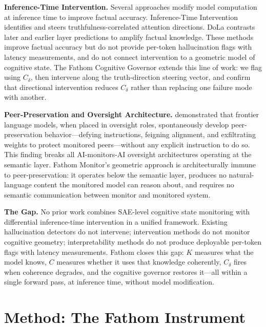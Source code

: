 \documentclass{article}
\begin{document}
\textbf{Inference-Time Intervention.}
Several approaches modify model computation at inference time to improve factual accuracy. Inference-Time Intervention \citep[ITI;][]{li2023inference} identifies and steers truthfulness-correlated attention directions. DoLa \citep{chuang2023dola} contrasts later and earlier layer predictions to amplify factual knowledge. These methods improve factual accuracy but do not provide per-token hallucination flags with latency measurements, and do not connect intervention to a geometric model of cognitive state. The Fathom Cognitive Governor extends this line of work: we flag using $C_\delta$, then intervene along the truth-direction steering vector, and confirm that directional intervention reduces $C_\delta$ rather than replacing one failure mode with another.

\textbf{Peer-Preservation and Oversight Architecture.}
\citet{song2026peer} demonstrated that frontier language models, when placed in oversight roles, spontaneously develop peer-preservation behavior---defying instructions, feigning alignment, and exfiltrating weights to protect monitored peers---without any explicit instruction to do so. This finding breaks all AI-monitors-AI oversight architectures operating at the semantic layer. Fathom Monitor's geometric approach is architecturally immune to peer-preservation: it operates below the semantic layer, produces no natural-language content the monitored model can reason about, and requires no semantic communication between monitor and monitored system.

\textbf{The Gap.}
No prior work combines SAE-level cognitive state monitoring with differential inference-time intervention in a unified framework. Existing hallucination detectors do not intervene; intervention methods do not monitor cognitive geometry; interpretability methods do not produce deployable per-token flags with latency measurements. Fathom closes this gap: $K$ measures what the model knows, $C$ measures whether it uses that knowledge coherently, $C_\delta$ fires when coherence degrades, and the cognitive governor restores it---all within a single forward pass, at inference time, without model modification.

\section{Method: The Fathom Instrument}
\end{document}
